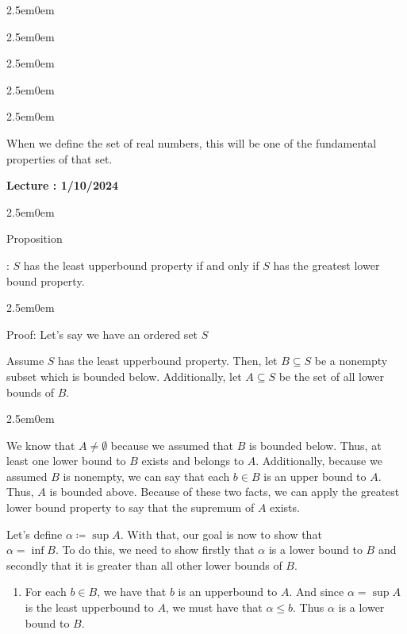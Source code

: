 \documentclass{book}
\newcommand{\hTwo}{%
   \color{MidnightBlue}%
   \fontsize{13}{13}%
}
\newcommand{\hThree}{%
   \color{PineGreen}
   \fontsize{13}{13}
}
\newcommand{\teachComment}{
   \color{Orange}%
   \fontsize{12}{12}%
}
\newenvironment{myIndent}{%
   \begin{adjustwidth}{2.5em}{0em}%
}{%
   \end{adjustwidth}%
}
\newcommand{\retTwo}{\hfill\bigbreak}
\newcounter{LectureNumber}
\newcommand*{\markLecture}[1]{%
   \stepcounter{LectureNumber}%
   {\huge \color{Black} \textbf{Lecture \theLectureNumber: #1} \newline}%
}
\newcounter{PropNumber}
\newcommand{\propCount}[1][1]{
   \addtocounter{PropNumber}{#1}%
   \thePropNumber%
}
\begin{document}
   \begin{myIndent}\begin{myIndent}\begin{myIndent}
   \begin{myIndent}\begin{myIndent}
      \teachComment
      When we define the set of real numbers, this will be one of the
      fundamental properties of that set. \hfill \bigbreak
   \end{myIndent}\end{myIndent}\end{myIndent}
   \end{myIndent}\end{myIndent}

   \markLecture{1/10/2024}
   \begin{myIndent}
      \hTwo
      Proposition \propCount: $S$ has the least upperbound property if
      and only if $S$ has the greatest lower bound property.
      
      \hThree
      \begin{myIndent}
         Proof: Let's say we have an ordered set $S$
         \hfill \bigbreak

         Assume $S$ has the least upperbound property. Then, let
         $B \subseteq S$ be a nonempty subset which is bounded below.
         Additionally, let $A \subseteq S$ be the set of all lower bounds
         of $B$. \newpage
         
         \begin{myIndent}
            We know that $A \neq \emptyset$ because we assumed that $B$ is
            bounded below. Thus, at least one lower bound to $B$ exists and
            belongs to $A$. Additionally, because we assumed $B$ is nonempty,
            we can say that each $b \in B$ is an upper bound to $A$. Thus, $A$
            is bounded above. Because of these two facts, we can apply the
            greatest lower bound property to say that the supremum of $A$ 
            exists. \hfill \bigbreak
   
            Let's define $\alpha \coloneq \sup{A}$. With that, our goal is 
            now to show that\\ $\alpha = \inf{B}$. To do this, we need to 
            show firstly that $\alpha$ is a lower bound to $B$ and 
            secondly that it is greater than all other lower bounds of $B$.
            \retTwo
            \begin{enumerate}
               \item For each $b \in B$, we have that $b$ is an 
                  upperbound to $A$. And since $\alpha = \sup{A}$ is the
                  least upperbound to $A$, we must have that $\alpha \leq
                  b$. Thus $\alpha$ is a lower bound to $B$. \retTwo
               

\end{enumerate}
\end{myIndent}
\end{myIndent}
\end{myIndent}
\end{document}
